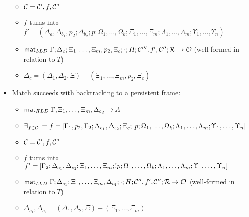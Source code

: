 \begin{lemma}
\begin{itemize}[leftmargin=*]
\begin{itemize}[leftmargin=\secondm]
      \item $\mathcal{C} = \mathcal{C'}, f, \mathcal{C''}$

      \item $f$ turns into $f' = (\Delta_a, \Delta_{b_1}, p_2;
            \Delta_{b_2}; p; \Omega_1, \dotsc, \Omega_k; \Xi_1, \dotsc, \Xi_m;
            \Lambda_1, \dotsc, \Lambda_m; \Upsilon_1, \dotsc, \Upsilon_n)$

      \item $\mathsf{mat}_{LLD} \; \Gamma; \Delta_c; \Xi_1, \dotsc, \Xi_m, p_2, \Xi_c; \cdot; H;
            \mathcal{C'''}, f', \mathcal{C''}; \mathcal{R} \rightarrow \mathcal{O}$ (well-formed in
                  relation to $T$)
      \item $\Delta_c = (\Delta_1, \Delta_2, \Xi) - (\Xi_1, \dotsc, \Xi_m, p_2, \Xi_c)$
   \end{itemize}

   \item Match succeeds with backtracking to a persistent frame:
   \begin{itemize}[leftmargin=\secondm]
      \item $\mathsf{mat}_{HLD} \; \Gamma; \Xi_1, \dotsc, \Xi_m, \Delta_{c_2} \rightarrow A$
      \item $\exists_{f \in \mathcal{C}}. = f = [\Gamma_1, p_2, \Gamma_2; \Delta_{c_1}, \Delta_{c_2}; \Xi_c; {!}
         p; \Omega_1, \dotsc, \Omega_k; \Lambda_1, \dotsc, \Lambda_m;
         \Upsilon_1, \dotsc, \Upsilon_n]$
      \item $\mathcal{C} = \mathcal{C'}, f, \mathcal{C''}$
      \item $f$ turns into $f' = [\Gamma_2; \Delta_{c_1}, \Delta_{c_2}; \Xi_1, \dotsc,
         \Xi_m; {!} p; \Omega_1, \dotsc, \Omega_k; \Lambda_1, \dotsc,
         \Lambda_m; \Upsilon_1, \dotsc, \Upsilon_n]$
      \item $\mathsf{mat}_{LLD} \; \Gamma; \Delta_{c_1}; \Xi_1, \dotsc, \Xi_m, \Delta_{c_2};
         \cdot; H; \mathcal{C''}, f', \mathcal{C''}; \mathcal{R} \rightarrow \mathcal{O}$ (well-formed in
            relation to $T$)
      \item $\Delta_{c_1}, \Delta_{c_2} = (\Delta_1, \Delta_2,
            \Xi) - (\Xi_1, \dotsc, \Xi_m)$
   \end{itemize}
\end{itemize}
\end{lemma}


